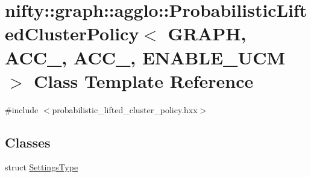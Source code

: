 \hypertarget{classnifty_1_1graph_1_1agglo_1_1ProbabilisticLiftedClusterPolicy}{}\section{nifty\+:\+:graph\+:\+:agglo\+:\+:Probabilistic\+Lifted\+Cluster\+Policy$<$ G\+R\+A\+PH, A\+C\+C\+\_, A\+C\+C\+\_, E\+N\+A\+B\+L\+E\+\_\+\+U\+CM $>$ Class Template Reference}
\label{classnifty_1_1graph_1_1agglo_1_1ProbabilisticLiftedClusterPolicy}


{\ttfamily \#include $<$probabilistic\+\_\+lifted\+\_\+cluster\+\_\+policy.\+hxx$>$}

\subsection*{Classes}
\begin{DoxyCompactItemize}
\item 
struct \hyperlink{structnifty_1_1graph_1_1agglo_1_1ProbabilisticLiftedClusterPolicy_1_1SettingsType}{Settings\+Type}
\end{DoxyCompactItemize}
